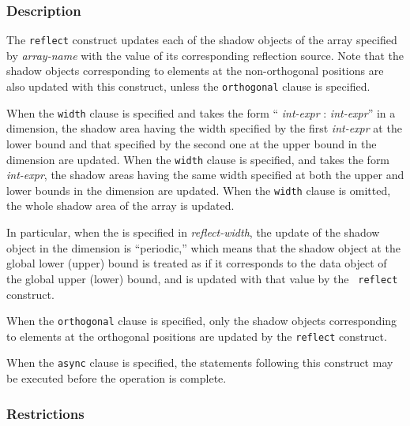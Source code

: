 \subsubsection*{Description}

The {\tt reflect} construct updates each of the shadow objects of the
array specified by {\it array-name} with the value of its corresponding
reflection source. Note that the shadow objects corresponding to
elements at the non-orthogonal positions are also updated with this
construct, unless the {\tt orthogonal} clause is specified.


When the {\tt width} clause is specified and takes the form ``{\it
int-expr} : {\it int-expr}'' in a dimension, the shadow area having the
width specified by the first {\it int-expr} at the lower bound and that
specified by the second one at the upper bound in the dimension are
updated.
%
When the {\tt width} clause is specified, and takes the form {\it int-expr},
the shadow areas having the same width specified at both the upper
and lower bounds in the dimension are updated.
%
When the {\tt width} clause is omitted, the whole shadow area of the array
is updated.

In particular, when the  is specified in
{\it reflect-width}, the update of the shadow object in the dimension is
``periodic,'' which means that the shadow object at the global lower
(upper) bound is treated as if it corresponds to the data object of the
global upper (lower) bound, and is updated with that value by the {\tt
reflect} construct.

When the {\tt orthogonal} clause is specified, only the shadow objects
corresponding to elements at the orthogonal positions are updated by the
{\tt reflect} construct.

When the {\tt async} clause is specified, the statements following this
construct may be executed before the operation is complete.

\subsubsection*{Restrictions}

